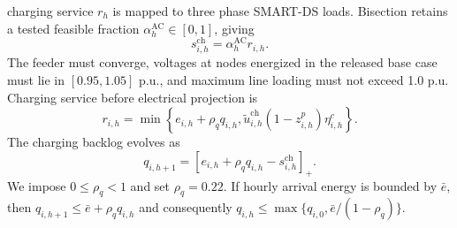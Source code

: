 \documentclass[journal]{IEEEtran}
\begin{document}
charging service $r_h$ is mapped to three phase SMART-DS loads.  Bisection
retains a tested feasible fraction $\alpha_h^{\mathrm{AC}}\in[0,1]$, giving
\begin{equation}
s_{i,h}^{\mathrm{ch}}=\alpha_h^{\mathrm{AC}}r_{i,h}.
\label{eq:smartds-project}
\end{equation}
The feeder must converge, voltages at nodes energized in the released base case must lie in
$[0.95,1.05]$ p.u., and maximum line loading must not exceed 1.0 p.u.  Charging
service before electrical projection is
\begin{equation}
r_{i,h}=
\min\left\{e_{i,h}+\rho_q q_{i,h},
\tilde u_{i,h}^{\mathrm{ch}}(1-z_{i,h}^{p})\eta_{i,h}^{c}\right\}.
\end{equation}
The charging backlog evolves as
\begin{equation}
q_{i,h+1}=
\left[e_{i,h}+\rho_q q_{i,h}
-s_{i,h}^{\mathrm{ch}}\right]_+ .
\end{equation}
We impose $0\le\rho_q<1$ and set $\rho_q=0.22$.  If hourly
arrival energy is bounded by $\bar e$, then
$q_{i,h+1}\le \bar e+\rho_q q_{i,h}$ and consequently
$q_{i,h}\le\max\{q_{i,0},\bar e/(1-\rho_q)\}$.
\end{document}
